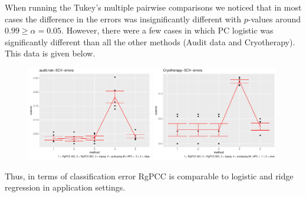 \documentclass[main.tex]{subfiles}
\begin{document}
When running the Tukey's multiple pairwise comparisons we noticed that in most cases the difference in the errors was insignificantly different with $p$-values around $0.99 \geq \alpha = 0.05$. However, there were a few cases in which PC logistic was significantly different than all the other methods (Audit data and Cryotherapy). This data is given below.

\begin{figure}[H]
    \centering
    \includegraphics[width =  0.49\textwidth]{general-images/audit.risk-5CV-errors graph.pdf}
    \includegraphics[width =  0.49\textwidth]{general-images/Cryotherapy-5CV-errors graph.pdf}
    \label{fig:my_label}
\end{figure}

Thus, in terms of classification error RgPCC is comparable to logistic and ridge regression in application settings.
\end{document}
